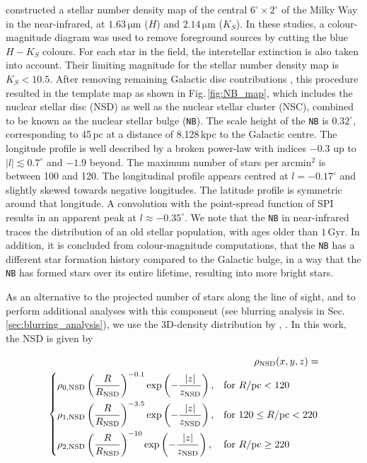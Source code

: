 \documentclass[doublespace,nopageskip]{VTthesis} %
\newcommand{\mrm}[1]{\mathrm{#1}}
\begin{document}
\begin{appendices}
	\citet{Nishiyama2013_NuclearBulge_PlasmaMagnet} constructed a stellar number density map of the central $6^{\circ} \times 2^{\circ}$ of the Milky Way in the near-infrared, at $1.63\,\mrm{\mu m}$ ($H$) and $2.14\,\mrm{\mu m}$ ($K_S$).
	In these studies, a colour-magnitude diagram was used to remove foreground sources by cutting the blue $H-K_S$ colours.
	For each star in the field, the interstellar extinction is also taken into account.
	Their limiting magnitude for the stellar number density map is $K_S<10.5$.
	After removing remaining Galactic disc contributions \citep{Macias2018_LATGeV}, this procedure resulted in the template map as shown in Fig.\,\ref{fig:NB_map}, which includes the nuclear stellar disc (NSD) as well as the nuclear stellar cluster (NSC), combined to be known as the nuclear stellar bulge (\texttt{NB}).
	The scale height of the \texttt{NB} is $0.32^{\circ}$, corresponding to 45\,pc at a distance of 8.128\,kpc to the Galactic centre.
	The longitude profile is well described by a broken power-law with indices $-0.3$ up to $|l| \lesssim 0.7^{\circ}$ and $-1.9$ beyond.
	The maximum number of stars per $\mrm{arcmin^2}$ is between 100 and 120.
	The longitudinal profile appears centred at $l=-0.17^{\circ}$ and slightly skewed towards negative longitudes.
	The latitude profile is symmetric around that longitude.
	A convolution with the point-spread function of SPI results in an apparent peak at $l \approx -0.35^{\circ}$.
	We note that the \texttt{NB} in near-infrared traces the distribution of an old stellar population, with ages older than $1\,\mrm{Gyr}$.
	In addition, it is concluded from colour-magnitude computations, that the \texttt{NB} has a different star formation history compared to the Galactic bulge, in a way that the \texttt{NB} has formed stars over its entire lifetime, resulting into more bright stars.
	
	As an alternative to the projected number of stars along the line of sight, and to perform additional analyses with this component (see blurring analysis in Sec.\,\ref{sec:blurring_analysis}), we use the 3D-density distribution by \citet{Launhardt2002_NB}, \citep[see also][]{Bartels2018_GeVexcess_stars}.
	In this work, the NSD is given by
	
	\begin{eqnarray}
		\rho_{\rm NSD}(x,y,z) = & \\\nonumber \left \{
		\begin{aligned}
			&\rho_{0,\rm NSD} \left(\frac{R}{R_{\rm NSD}}\right)^{-0.1} \exp\left(-\frac{|z|}{z_{\rm NSD}}\right), && \text{for}\ R/\mrm{pc} < 120 \\
			&\rho_{1,\rm NSD} \left(\frac{R}{R_{\rm NSD}}\right)^{-3.5} \exp\left(-\frac{|z|}{z_{\rm NSD}}\right), && \text{for}\ 120 \leq R/\mrm{pc} < 220 \\
			&\rho_{2,\rm NSD} \left(\frac{R}{R_{\rm NSD}}\right)^{-10} \exp\left(-\frac{|z|}{z_{\rm NSD}}\right), && \text{for}\ R/\mrm{pc} \geq 220 
		\end{aligned} \right. &
		\label{eq:NSD_formula}
	\end{eqnarray} 
	

\end{appendices}
\end{document}
